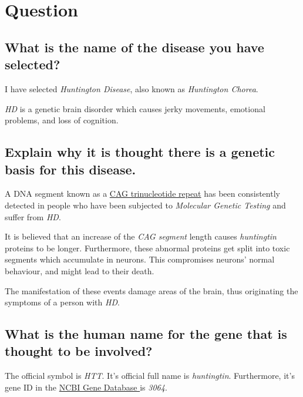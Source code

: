 \section{Question}

\subsection{What is the name of the disease you have selected?}

I have selected \textit{Huntington Disease}, also known as \textit{Huntington Chorea}.

\medskip

\textit{HD} is a genetic brain disorder which causes jerky movements, emotional problems, and loss of cognition.

\medskip


\subsection{Explain why it is thought there is a genetic basis for this disease.}

A DNA segment known as a \href{https://ghr.nlm.nih.gov/art/large/repeatexpansion.jpeg}{CAG trinucleotide repeat} has been consistently detected in people who have been subjected to \textit{Molecular Genetic Testing} and suffer from \textit{HD}.

\medskip

It is believed that an increase of the \textit{CAG segment} length causes \textit{huntingtin} proteins to be longer. Furthermore, these abnormal proteins get split into toxic segments which accumulate in neurons. This compromises neurons' normal behaviour, and might lead to their death.

\medskip

The manifestation of these events damage areas of the brain, thus originating the symptoms of a person with \textit{HD}.

\medskip


\subsection{What is the human name for the gene that is thought to be involved?}

The official symbol is \textit{HTT}. It's official full name is \textit{huntingtin}. Furthermore, it's gene ID in the \href{http://www.ncbi.nlm.nih.gov/gene/}{NCBI Gene Database } is \textit{3064}.

